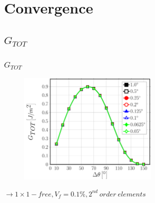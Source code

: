 \documentclass[first,firstsupp,lastsupp,last,hyperref,table]{ETHclass}
\begin{document}
\section{Convergence}

\subsection{$G_{TOT}$}

%

\begin{frame}
\frametitle{\vspace{0.25cm}\small $G_{TOT}$}
\vspace{-.75cm}
\centering
\begin{figure}
\centering
\includegraphics[width=0.6\textwidth]{Vf0_1-free-2nd-GTOT.pdf}
\end{figure}
$\rightarrow 1\times1-free, V_{f}=0.1\%, 2^{nd}\ order\ elements$ 
\end{frame}

%
%
%
\end{document}
